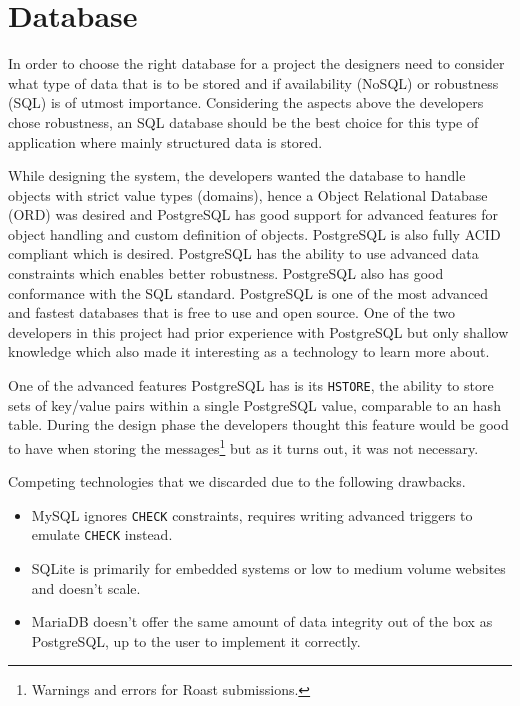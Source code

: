 \documentclass[12pt,a4paper]{report}
\begin{document}
\section{Database}
In order to choose the right database for a project the designers need to consider what type of data that is to be stored and if availability (NoSQL) or robustness (SQL) is of utmost importance.
Considering the aspects above the developers chose robustness, an SQL database should be the best choice for this type of application where mainly structured data is stored. 

While designing the system, the developers wanted the database to handle objects with strict value types (domains), hence a Object Relational Database (ORD) was desired and PostgreSQL has good support for advanced features for object handling and custom definition of objects. PostgreSQL is also fully ACID compliant\cite{pg-acid} which is desired. PostgreSQL has the ability to use advanced data constraints which enables better robustness. PostgreSQL also has good conformance with the SQL standard\cite{pg-sql-conformance}. PostgreSQL is one of the most advanced and fastest databases\cite{db-benchmark} that is free to use and open source.
One of the two developers in this project had prior experience with PostgreSQL but only shallow knowledge which also made it interesting as a technology to learn more about.

One of the advanced features PostgreSQL has is its \texttt{HSTORE}, the ability to store sets of key/value pairs within a single PostgreSQL value\cite{pg-hstore}, comparable to an hash table. During the design phase the developers thought this feature would be good to have when storing the messages\footnote{Warnings and errors for Roast submissions.} but as it turns out, it was not necessary.

Competing technologies that we discarded due to the following drawbacks.
\begin{itemize}
    \item MySQL ignores \texttt{CHECK} constraints\cite{mysql-check-constraint}, requires writing advanced triggers to emulate \texttt{CHECK} instead\cite{mysql-emulate-check}.
    \item SQLite is primarily for embedded systems or low to medium volume websites and doesn't scale\cite{sqlite-when-to-use}.
    \item MariaDB doesn't offer the same amount of data integrity out of the box as \\ PostgreSQL\cite{mariadb-data-integrity}, up to the user to implement it correctly. 
\end{itemize}
\end{document}
